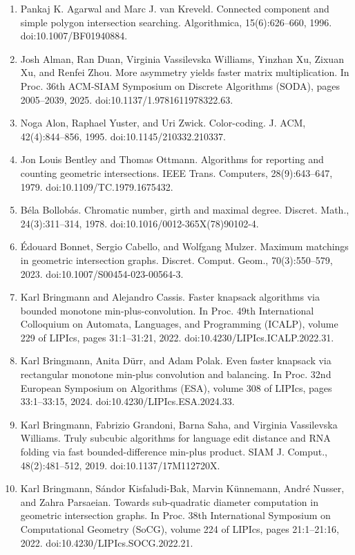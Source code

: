 \begin{enumerate}
\item[]  [1]  Pankaj K. Agarwal and Marc J. van Kreveld.  Connected component and simple polygon intersection searching.  Algorithmica, 15(6):626–660, 1996.  doi:10.1007/BF01940884.  
\item[]  [2]  Josh Alman, Ran Duan, Virginia Vassilevska Williams, Yinzhan Xu, Zixuan Xu, and Renfei Zhou.  More asymmetry yields faster matrix multiplication.  In Proc. 36th ACM-SIAM Symposium on Discrete Algorithms (SODA), pages 2005–2039, 2025.  doi:10.1137/1.9781611978322.63.  
\item[]  [3]  Noga Alon, Raphael Yuster, and Uri Zwick.  Color-coding.  J. ACM, 42(4):844–856, 1995.  doi:10.1145/210332.210337.  
\item[]  [4]  Jon Louis Bentley and Thomas Ottmann.  Algorithms for reporting and counting geometric intersections.  IEEE Trans. Computers, 28(9):643–647, 1979.  doi:10.1109/TC.1979.1675432.  
\item[]  [5]  Béla Bollobás.  Chromatic number, girth and maximal degree.  Discret. Math., 24(3):311–314, 1978.  doi:10.1016/0012-365X(78)90102-4.  
\item[]  [6]  Édouard Bonnet, Sergio Cabello, and Wolfgang Mulzer.  Maximum matchings in geometric intersection graphs.  Discret. Comput. Geom., 70(3):550–579, 2023.  doi:10.1007/S00454-023-00564-3.  
\item[]  [7]  Karl Bringmann and Alejandro Cassis.  Faster knapsack algorithms via bounded monotone min-plus-convolution.  In Proc. 49th International Colloquium on Automata, Languages, and Programming (ICALP), volume 229 of LIPIcs, pages 31:1–31:21, 2022.  doi:10.4230/LIPIcs.ICALP.2022.31.  
\item[]  [8]  Karl Bringmann, Anita Dürr, and Adam Polak.  Even faster knapsack via rectangular monotone min-plus convolution and balancing.  In Proc. 32nd European Symposium on Algorithms (ESA), volume 308 of LIPIcs, pages 33:1–33:15, 2024.  doi:10.4230/LIPIcs.ESA.2024.33.  
\item[]  [9]  Karl Bringmann, Fabrizio Grandoni, Barna Saha, and Virginia Vassilevska Williams.  Truly subcubic algorithms for language edit distance and RNA folding via fast bounded-difference min-plus product.  SIAM J. Comput., 48(2):481–512, 2019.  doi:10.1137/17M112720X.  
\item[]  [10]  Karl Bringmann, Sándor Kisfaludi-Bak, Marvin Künnemann, André Nusser, and Zahra Parsaeian.  Towards sub-quadratic diameter computation in geometric intersection graphs.  In Proc. 38th International Symposium on Computational Geometry (SoCG), volume 224 of LIPIcs, pages 21:1–21:16, 2022.  doi:10.4230/LIPIcs.SOCG.2022.21.  

\end{enumerate}

